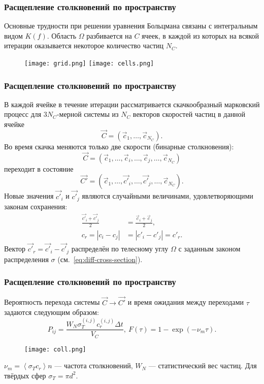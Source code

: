 \documentclass[onlymath]{beamer}
\newcommand{\abs}[1]{\left \lvert{#1}\right \rvert}
\newcommand\avg[1]{\left\langle{#1}\right\rangle}
\newcommand{\ts}{\Delta t}
\newcommand{\statw}{W_N}
\newcommand\dom{\Omega}
\newcommand{\cf}{\nu_m}
\newcommand{\dcs}{\sigma}
\newcommand{\ccs}{\sigma_T}
\begin{document}
\begin{frame}
  \frametitle{Расщепление столкновений по пространству}
  Основные трудности при решении уравнения Больцмана связаны с
  интегральным видом $K(f)$. Область $\dom$ разбивается на $C$ ячеек,
  в каждой из которых на всякой итерации оказывается некоторое
  количество частиц $N_C$.
  \begin{figure}[!h]
    \centering
    \texttt{[image: grid.png]}
    \texttt{[image: cells.png]}
  \end{figure}
\end{frame}

\begin{frame}
  \frametitle{Расщепление столкновений по пространству}
  В каждой ячейке в течение итерации рассматривается скачкообразный
  марковский процесс для $3N_C$-мерной системы из $N_C$ векторов
  скоростей частиц в данной ячейке
  \begin{equation*}
    \vec{C} = (\vec{c}_1, \dotsc, \vec{c}_{N_C}).
  \end{equation*}
  Во время скачка меняются только две скорости (бинарные
  столкновения):
  \begin{equation*}
    \vec{C} = (\vec{c}_1,\dotsc,\vec{c}_i,\dotsc,\vec{c}_j,\dotsc,\vec{c}_{N_C})
  \end{equation*}
  переходит в состояние 
  \begin{equation*}
    \vec{C'} = (\vec{c}_1,\dotsc,\vec{c'}_i,\dotsc,\vec{c'}_j,\dotsc,\vec{c}_{N_C}).
  \end{equation*}
  Новые значения $\vec{c'}_i$ и $\vec{c'}_j$ являются случайными
  величинами, удовлетворяющими законам сохранения:
  \begin{equation*}
    \begin{aligned}
      \frac{\vec{c'}_i+\vec{c'}_j}{2} &=
      \frac{\vec{c}_i+\vec{c}_j}{2},\\
      c_r = \abs{c_i - c_j} &= \abs{c'_i - c'_j} = c'_r.
    \end{aligned}
  \end{equation*}
 Вектор $\vec{c'}_r = \vec{c'}_i - \vec{c'}_j$ распределён по
  телесному углу $\Omega$ с заданным законом распределения $\dcs$
  (см. \eqref{eq:diff-cross-section}).
\end{frame}

\begin{frame}
  \frametitle{Расщепление столкновений по пространству}
  Вероятность перехода системы $\vec{C} \to \vec{C'}$ и время ожидания
  между переходами $\tau$ задаются следующим образом:
  \begin{equation*}
    \label{eq:coll-prob-generic}
    P_{ij} = \frac{\statw\ccs^{(i,j)}c_r^{(i, j)} \ts}{V_C},\:    F(\tau) = 1 - \exp(-\cf \tau).
  \end{equation*}
  \begin{figure}[!h]
    \centering
    \texttt{[image: coll.png]}
  \end{figure}
  $\cf = \avg{\ccs c_r} n$ — частота столкновений, $\statw$ —
  статистический вес частиц. Для твёрдых сфер $\ccs = \pi d^2$.
\end{frame}
\end{document}
